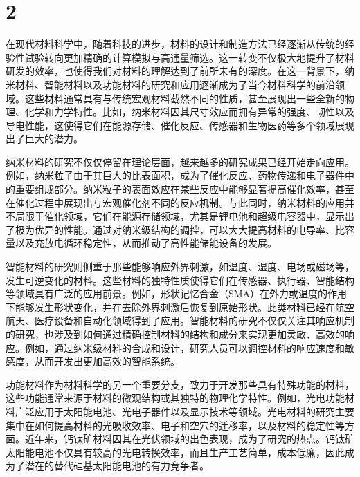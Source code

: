 \section{2}
在现代材料科学中，随着科技的进步，材料的设计和制造方法已经逐渐从传统的经验性试验转向更加精确的计算模拟与高通量筛选。这一转变不仅极大地提升了材料研发的效率，也使得我们对材料的理解达到了前所未有的深度。在这一背景下，纳米材料、智能材料以及功能材料的研究和应用逐渐成为了当今材料科学的前沿领域。这些材料通常具有与传统宏观材料截然不同的性质，甚至展现出一些全新的物理、化学和力学特性。比如，纳米材料因其尺寸效应而拥有异常的强度、韧性以及导电性能，这使得它们在能源存储、催化反应、传感器和生物医药等多个领域展现出了巨大的潜力。\par
纳米材料的研究不仅仅停留在理论层面，越来越多的研究成果已经开始走向应用。例如，纳米粒子由于其巨大的比表面积，成为了催化反应、药物传递和电子器件中的重要组成部分。纳米粒子的表面效应在某些反应中能够显著提高催化效率，甚至在催化过程中展现出与宏观催化剂不同的反应机制。与此同时，纳米材料的应用并不局限于催化领域，它们在能源存储领域，尤其是锂电池和超级电容器中，显示出了极为优异的性能。通过对纳米级结构的调控，可以大大提高材料的电导率、比容量以及充放电循环稳定性，从而推动了高性能储能设备的发展。\par
智能材料的研究则侧重于那些能够响应外界刺激，如温度、湿度、电场或磁场等，发生可逆变化的材料。这些材料的独特性质使得它们在传感器、执行器、智能结构等领域具有广泛的应用前景。例如，形状记忆合金（SMA）在外力或温度的作用下能够发生形状变化，并在去除外界刺激后恢复到原始形状。此类材料已经在航空航天、医疗设备和自动化领域得到了应用。智能材料的研究不仅仅关注其响应机制的研究，也涉及到如何通过精确控制材料的结构和成分来实现更加灵敏、高效的响应。例如，通过纳米级材料的合成和设计，研究人员可以调控材料的响应速度和敏感度，从而开发出更加高效的智能系统。\par
功能材料作为材料科学的另一个重要分支，致力于开发那些具有特殊功能的材料，这些功能通常来源于材料的微观结构或其独特的物理化学特性。例如，光电功能材料广泛应用于太阳能电池、光电子器件以及显示技术等领域。光电材料的研究主要集中在如何提高材料的光吸收效率、电子和空穴的迁移率，以及材料的稳定性等方面。近年来，钙钛矿材料因其在光伏领域的出色表现，成为了研究的热点。钙钛矿太阳能电池不仅具有较高的光电转换效率，而且生产工艺简单，成本低廉，因此成为了潜在的替代硅基太阳能电池的有力竞争者。\par
